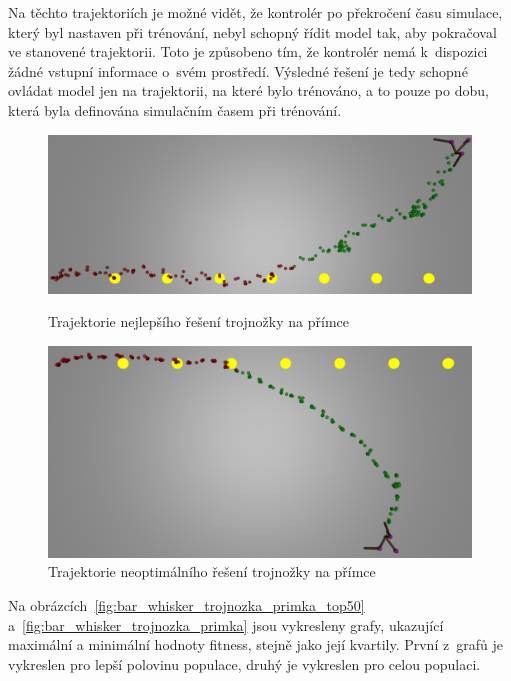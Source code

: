 Na těchto trajektoriích je možné vidět, že kontrolér po překročení času simulace, který byl nastaven při trénování, nebyl schopný řídit model tak, aby pokračoval ve stanovené trajektorii.
Toto je způsobeno tím, že kontrolér nemá k~dispozici žádné vstupní informace o~svém prostředí.
Výsledné řešení je tedy schopné ovládat model jen na trajektorii, na které bylo trénováno, a to pouze po dobu, která byla definována simulačním časem při trénování.


\begin{figure}[h]
    \begin{minipage}[c]{0.48\linewidth}
        \includegraphics[width=\linewidth]{obrazky/trojnozka_primka_zhora_nejlepsi_reseni_trajektorie.png}
        \caption{Trajektorie nejlepšího řešení trojnožky na přímce}
        \label{fig:trojnozka_primka_zhora_nejlepsi_reseni_trajektorie}
    \end{minipage}
    \hfill
    \begin{minipage}[c]{0.48\linewidth}
        \includegraphics[width=\linewidth]{obrazky/trojnozka_primka_zhora_neoptimalni_reseni_trajektorie.png}
        \caption{Trajektorie neoptimálního řešení trojnožky na přímce}
        \label{fig:trojnozka_primka_zhora_neoptimalni_reseni_trajektorie}
    \end{minipage}
\end{figure}

Na obrázcích~\ref{fig:bar_whisker_trojnozka_primka_top50} a~\ref{fig:bar_whisker_trojnozka_primka} jsou vykresleny grafy, ukazující maximální a minimální hodnoty fitness, stejně jako její kvartily.
První z~grafů je vykreslen pro lepší polovinu populace, druhý je vykreslen pro celou populaci.

